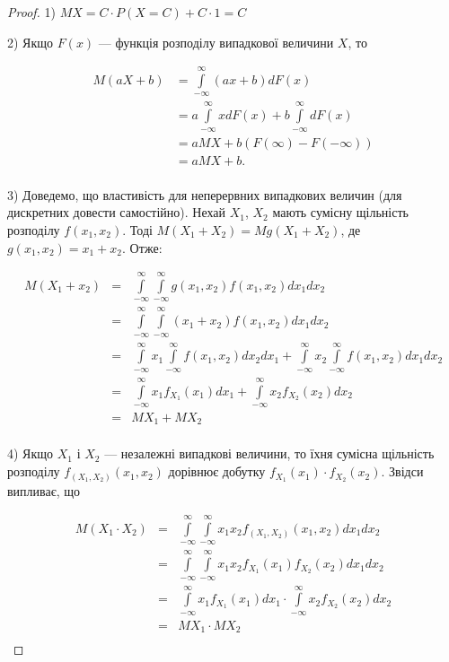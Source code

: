 \begin{proof}
    1) $MX = C \cdot P(X=C) + C \cdot 1 = C$
    
    2) Якщо $F(x)$ --- функція розподілу випадкової величини $X$, то 
    
    $$\begin{array}{rl}
        M(aX + b) & = \int\limits_{-\infty}^{\infty} (ax+b)dF(x) \\
        & = a \int\limits_{-\infty}^{\infty} xdF(x) + b \int\limits_{-\infty}^{\infty} dF(x) \\
        & = a MX + b(F(\infty)-F(-\infty)) \\
        & = a MX + b.\\
    \end{array}$$
    
    3) Доведемо, що властивість для неперервних випадкових величин
    (для дискретних довести самостійно).
    Нехай $X_1$, $X_2$ мають сумісну щільність розподілу $f(x_1, x_2)$.
    Тоді $M(X_1 + X_2)= Mg(X_1 + X_2)$, де $g(x_1, x_2) = x_1 + x_2$.
    Отже:
    
    $$\begin{array}{rcl}
        M(X_1 + x_2) & = & \int\limits_{-\infty}^{\infty} \int\limits_{-\infty}^{\infty} g(x_1, x_2) f(x_1, x_2) dx_1 dx_2 \\
        & = & \int\limits_{-\infty}^{\infty} \int\limits_{-\infty}^{\infty} (x_1 + x_2) f(x_1, x_2) dx_1 dx_2 \\
        & = & \int\limits_{-\infty}^{\infty} x_1 \int\limits_{-\infty}^{\infty} f(x_1, x_2) dx_2 dx_1 
            + \int\limits_{-\infty}^{\infty} x_2 \int\limits_{-\infty}^{\infty} f(x_1, x_2) dx_1 dx_2 \\
        & = & \int\limits_{-\infty}^{\infty} x_1 f_{X_1}(x_1) dx_1 
            + \int\limits_{-\infty}^{\infty} x_2 f_{X_2}(x_2) dx_2 \\
        & = & MX_1 + MX_2 \\
    \end{array}$$
    
    4) Якщо $X_1$ і $X_2$ --- незалежні випадкові величини,
    то їхня сумісна щільність розподілу $f_{(X_1, X_2)} (x_1, x_2)$
    дорівнює добутку $f_{X_1} (x_1) \cdot f_{X_2} (x_2)$.
    Звідси випливає, що
    
    $$\begin{array}{rcl}
        M(X_1 \cdot X_2) & = & \int\limits_{-\infty}^{\infty} \int\limits_{-\infty}^{\infty}
            x_1 x_2 f_{(X_1, X_2)}(x_1, x_2) dx_1 dx_2 \\
        & = & \int\limits_{-\infty}^{\infty} \int\limits_{-\infty}^{\infty}
            x_1 x_2 f_{X_1}(x_1) f_{X_2}(x_2) dx_1 dx_2 \\
        & = & \int\limits_{-\infty}^{\infty} x_1 f_{X_1}(x_1) dx_1
            \cdot \int\limits_{-\infty}^{\infty} x_2 f_{X_2}(x_2) dx_2 \\
        & = & MX_1 \cdot MX_2 \\
    \end{array}$$
\end{proof}

